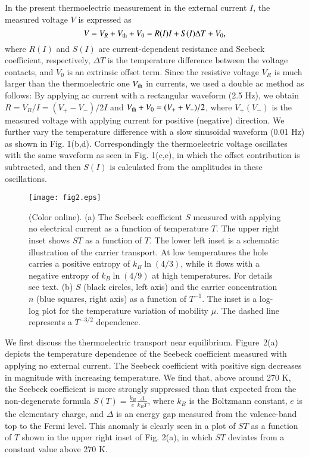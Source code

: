 \documentclass[aps,twocolumn,showpacs,preprintnumbers,amsmath,amssymb,floats,citeautoscript,nobalancelastpage]{revtex4-1}
\begin{document}
In the present thermoelectric measurement in the external current $I$, the measured voltage $V$  is expressed as 
\begin{equation}
V = V_R+V_{\rm th}+V_0 = R(I)I+S(I)\Delta T +V_0,
\end{equation}
where $R(I)$ and $S(I)$ are current-dependent resistance and Seebeck coefficient, respectively,
$\Delta T$ is the temperature difference between the voltage contacts,
and $V_0$ is an extrinsic offset term.
Since the resistive voltage $V_R$ is 
much larger than the thermoelectric one $V_{\rm th}$ in currents,
we used a double ac method as follows: 
By applying ac current with a rectangular waveform (2.5 Hz),
we obtain 
$R =V_R/I = (V_+-V_-)/2I$
and 
$V_{\rm th}+V_0 = (V_++V_-)/2$,
where $V_+(V_-)$ is the measured voltage with applying current for positive (negative) direction.
We further vary the temperature difference with a slow sinusoidal waveform (0.01 Hz)
as shown in Fig. 1(b,d).
Correspondingly the thermoelectric voltage oscillates with the same waveform as seen in Fig. 1(c,e),
in which the offset contribution is subtracted,
and then $S(I)$ is  calculated from the amplitudes in these oscillations.


\begin{figure}[t]
\begin{center}
\texttt{[image: fig2.eps]}
\caption{(Color online).
(a) The Seebeck coefficient $S$ measured with applying no electrical current as a function of temperature $T$.
The upper right inset shows $ST$ as a function of $T$.
The lower left inset is a schematic illustration of the carrier transport. 
At low temperatures the hole carries a positive entropy of $k_B\ln(4/3)$, while 
it flows with a negative entropy of $k_B\ln(4/9)$ at high temperatures.
For details see text.
(b) $S$ (black circles, left axis) and 
the carrier concentration $n$ (blue squares, right axis) as a function of $T^{-1}$.
The inset is a log-log plot for the temperature variation of mobility $\mu$.
The dashed line represents a $T^{-3/2}$ dependence.
}
\end{center}
\end{figure}


We first discuss the thermoelectric transport near equilibrium.
Figure~2(a) depicts the temperature dependence of the Seebeck coefficient measured with 
applying no external current.
The Seebeck coefficient with positive sign decreases in magnitude with increasing temperature.
We find that, above around 270 K,
the Seebeck coefficient is more strongly suppressed than that expected from 
the non-degenerate formula $S(T) = \frac{k_B}{e}\frac{\Delta}{k_BT}$,
where $k_B$ is the Boltzmann constant, $e$ is the elementary charge, and 
$\Delta$ is an energy gap measured from the valence-band top to the Fermi level.
This anomaly is clearly seen in a plot of $ST$ as a function of $T$
shown in the upper right inset of Fig. 2(a),
in which $ST$ deviates from a constant value above 270 K. 
\end{document}
